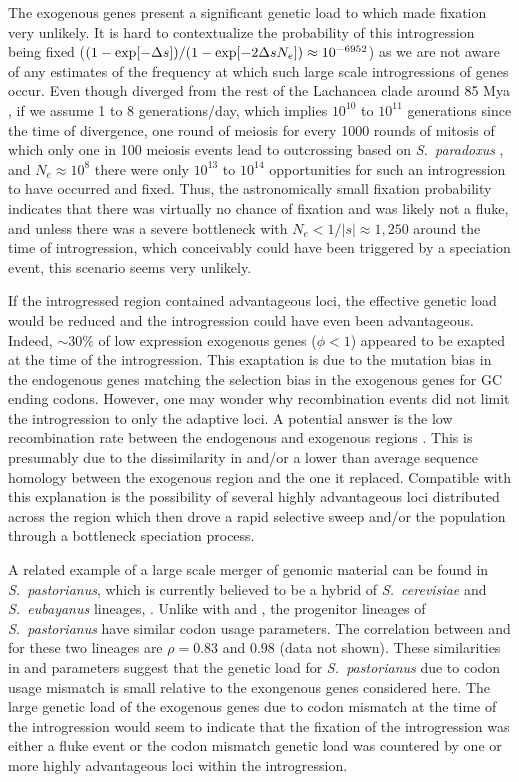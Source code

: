 \documentclass[fleqn,letterpaper]{article}
\begin{document}
The exogenous genes present a significant genetic load to \kluyveri which made fixation very unlikely.
It is hard to contextualize the probability of this introgression being fixed ($(1-\exp[-{\Delta s}])/(1-\exp[-2{\Delta s} N_e]) \approx 10^{-6952}$) as we are not aware of any estimates of the frequency at which such large scale introgressions of genes occur.
Even though \kluyveri diverged from the rest of the Lachancea clade around 85 Mya \citep{kensche2008, MHM2015}, if we assume 1 to 8 generations/day, which implies $10^{10}$ to $10^{11}$ generations since the time of divergence, one round of meiosis for every 1000 rounds of mitosis of which only one in 100 meiosis events lead to outcrossing based on \emph{S.~paradoxus} \citep{tsai2008}, and $N_e \approx 10^8$ there were only $10^{13}$ to $10^{14}$ opportunities for such an introgression to have occurred and fixed.
Thus, the astronomically small fixation probability indicates that there was virtually no chance of fixation and was likely not a fluke, and unless there was a severe bottleneck with $N_e < 1/|s| \approx 1,250$ around the time of introgression, which conceivably could have been triggered by a speciation event, this scenario seems very unlikely.

If the introgressed region contained advantageous loci, the effective genetic load would be reduced and the introgression could have even been advantageous.
Indeed, $\sim 30 \%$ of low expression exogenous genes ($\phi < 1$) appeared to be exapted at the time of the introgression.
This exaptation is due to the mutation bias in the endogenous genes matching the selection bias in the exogenous genes for GC ending codons.
However, one may wonder why recombination events did not limit the introgression to only the adaptive loci.
A potential answer is the low recombination rate between the endogenous and exogenous regions \citet{payen2009, brion2017} .
This is presumably due to the dissimilarity in \GC and/or a lower than average sequence homology between the exogenous region and the one it replaced.
Compatible with this explanation is the possibility of several highly advantageous loci distributed across the region which then drove a rapid selective sweep and/or the population through a bottleneck speciation process.

A related example of a large scale merger of genomic material can be found in \emph{S.~pastorianus}, which is currently believed to be a hybrid of \emph{S.~cerevisiae} and \emph{S.~eubayanus} lineages, \citep{baker2015}.
Unlike with \kluyveri and \gossypii, the  progenitor lineages of \emph{S.~pastorianus} have similar codon usage parameters.
The correlation between \DM and \DE for these two lineages are  $\rho = 0.83$ and  $0.98$ (data not shown).
These similarities in \DM and \DE parameters suggest that the genetic load for \emph{S.~pastorianus} due to codon usage mismatch is small relative to the exongenous genes considered here. 
The large genetic load of the exogenous genes due to codon mismatch at the time of the introgression would seem to indicate that the fixation of the introgression was either a fluke event or the codon mismatch genetic load was countered by one or more highly advantageous loci within the introgression.
\end{document}
